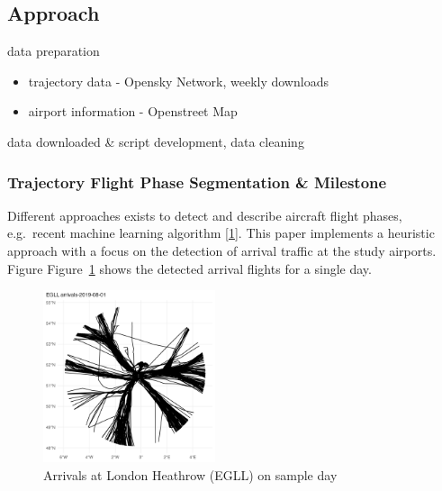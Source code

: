\documentclass[letterpaper, 10 pt, journal, twoside]{IEEEtran}
\providecommand{\tightlist}{%
  \setlength{\itemsep}{0pt}\setlength{\parskip}{0pt}}\usepackage{longtable,booktabs,array}
\begin{document}
\hypertarget{approach}{%
\subsection{Approach}\label{approach}}

data preparation

\begin{itemize}
\tightlist
\item
  trajectory data - Opensky Network, weekly downloads
\item
  airport information - Openstreet Map
\end{itemize}

data downloaded \& script development, data cleaning

\hypertarget{trajectory-flight-phase-segmentation-milestone}{%
\subsubsection{Trajectory Flight Phase Segmentation \&
Milestone}\label{trajectory-flight-phase-segmentation-milestone}}

Different approaches exists to detect and describe aircraft flight
phases, e.g.~recent machine learning algorithm
\protect\hyperlink{ref-sun2017flightphase}{{[}1{]}}. This paper
implements a heuristic approach with a focus on the detection of arrival
traffic at the study airports. Figure Figure~\ref{fig-EGLL-arrivals}
shows the detected arrival flights for a single day.

\begin{figure}

{\centering \includegraphics[width=0.45\textwidth,height=\textheight]{./figures/EGLL-arrivals-single-day.png}

}

\caption{\label{fig-EGLL-arrivals}Arrivals at London Heathrow (EGLL) on
sample day}

\end{figure}
\end{document}

